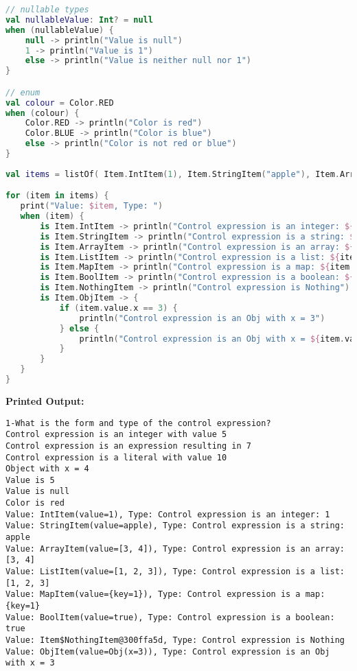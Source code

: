 \documentclass{article}
\begin{document}
\begin{itemize}
\begin{lstlisting}[language=Kotlin]
// nullable types
val nullableValue: Int? = null
when (nullableValue) {
    null -> println("Value is null")
    1 -> println("Value is 1")
    else -> println("Value is neither null nor 1")
}

// enum
val colour = Color.RED
when (colour) {
    Color.RED -> println("Color is red")
    Color.BLUE -> println("Color is blue")
    else -> println("Color is not red or blue")
}
  
val items = listOf( Item.IntItem(1), Item.StringItem("apple"), Item.ArrayItem(arrayOf(3, 4)), Item.ListItem(listOf(1, 2, 3)), Item.MapItem(mapOf("key" to 1)), Item.BoolItem(true), Item.NothingItem, Item.ObjItem(Obj(3)))

for (item in items) {
   print("Value: $item, Type: ")
   when (item) {
       is Item.IntItem -> println("Control expression is an integer: ${item.value}")
       is Item.StringItem -> println("Control expression is a string: ${item.value}")
       is Item.ArrayItem -> println("Control expression is an array: ${item.value.contentToString()}")
       is Item.ListItem -> println("Control expression is a list: ${item.value}")
       is Item.MapItem -> println("Control expression is a map: ${item.value}")
       is Item.BoolItem -> println("Control expression is a boolean: ${item.value}")
       is Item.NothingItem -> println("Control expression is Nothing")
       is Item.ObjItem -> {
           if (item.value.x == 3) {
               println("Control expression is an Obj with x = 3")
           } else {
               println("Control expression is an Obj with x = ${item.value.x}")
           }
       }
   }
}
\end{lstlisting}
\textbf{Printed Output:} 
\begin{verbatim}
1-What is the form and type of the control expression?
Control expression is an integer with value 5
Control expression is an expression resulting in 7
Control expression is a literal with value 10
Object with x = 4
Value is 5
Value is null
Color is red
Value: IntItem(value=1), Type: Control expression is an integer: 1
Value: StringItem(value=apple), Type: Control expression is a string: apple
Value: ArrayItem(value=[3, 4]), Type: Control expression is an array: [3, 4]
Value: ListItem(value=[1, 2, 3]), Type: Control expression is a list: [1, 2, 3]
Value: MapItem(value={key=1}), Type: Control expression is a map: {key=1}
Value: BoolItem(value=true), Type: Control expression is a boolean: true
Value: Item$NothingItem@300ffa5d, Type: Control expression is Nothing
Value: ObjItem(value=Obj(x=3)), Type: Control expression is an Obj with x = 3
\end{verbatim}





\end{itemize}
\end{document}

